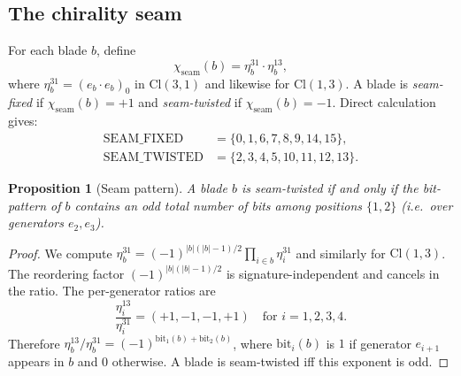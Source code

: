 \documentclass[11pt,a4paper]{article}
\theoremstyle{plain}
\newtheorem{proposition}[theorem]{Proposition}
\theoremstyle{definition}
\theoremstyle{remark}
\numberwithin{equation}{section}
\providecommand{\Cl}{\mathrm{Cl}}
\begin{document}
\subsection{The chirality seam}

For each blade $b$, define
\[
  \chi_{\mathrm{seam}}(b)
  = \eta_b^{31} \cdot \eta_b^{13},
\]
where $\eta_b^{31} = (e_b \cdot e_b)_0$ in $\Cl(3,1)$ and likewise
for $\Cl(1,3)$.  A blade is \emph{seam-fixed} if
$\chi_{\mathrm{seam}}(b) = +1$ and \emph{seam-twisted} if
$\chi_{\mathrm{seam}}(b) = -1$.  Direct calculation gives:
\begin{align*}
  \mathrm{SEAM\_FIXED}   &= \{0, 1, 6, 7, 8, 9, 14, 15\}, \\
  \mathrm{SEAM\_TWISTED} &= \{2, 3, 4, 5, 10, 11, 12, 13\}.
\end{align*}

\begin{proposition}[Seam pattern]\label{prop:seam}
A blade $b$ is seam-twisted if and only if the bit-pattern of $b$
contains an odd total number of bits among positions $\{1, 2\}$
(i.e.\ over generators $e_2, e_3$).
\end{proposition}

\begin{proof}
We compute $\eta_b^{31} = (-1)^{|b|(|b|-1)/2} \prod_{i \in b} \eta_i^{31}$
and similarly for $\Cl(1,3)$.  The reordering factor
$(-1)^{|b|(|b|-1)/2}$ is signature-independent and cancels in the
ratio.  The per-generator ratios are
\[
  \frac{\eta_i^{13}}{\eta_i^{31}} = (+1, -1, -1, +1)
  \quad\text{for } i = 1, 2, 3, 4.
\]
Therefore
$\eta_b^{13}/\eta_b^{31} = (-1)^{\mathrm{bit}_1(b) +
\mathrm{bit}_2(b)}$, where $\mathrm{bit}_i(b)$ is $1$ if generator
$e_{i+1}$ appears in $b$ and $0$ otherwise.  A blade is seam-twisted
iff this exponent is odd.
\end{proof}
\end{document}
